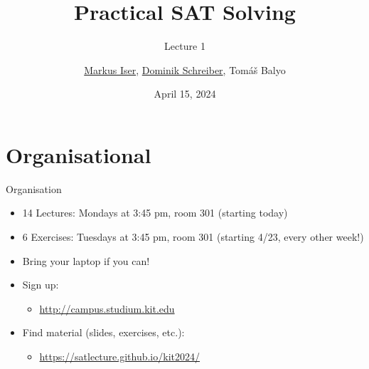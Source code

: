 \documentclass[t]{sdqbeamer}
\title[SAT Solving]{Practical SAT Solving}
\subtitle{Lecture 1}
\author{\underline{Markus Iser}, \underline{Dominik Schreiber}, Tom\'a\v{s} Balyo}
\date{April 15, 2024}
\begin{document}
\begin{frame}
	\thispagestyle{empty}
	\titlepage
\end{frame}

\section{Organisational}
\begin{frame}{Organisation}
	\begin{itemize}\setlength{\itemsep}{1em}
		\item 14 Lectures: Mondays at 3:45 pm, room 301 (starting today)
		\item 6 Exercises: Tuesdays at 3:45 pm, room 301 (starting 4/23, every other week!)
		\item Bring your laptop if you can!
		\item Sign up:
		\begin{itemize}
			\item \url{http://campus.studium.kit.edu}
		\end{itemize}
		\item Find material (slides, exercises, etc.):
		\begin{itemize}
			\item \url{https://satlecture.github.io/kit2024/}
		\end{itemize}
	\end{itemize}
\end{frame}
\end{document}
